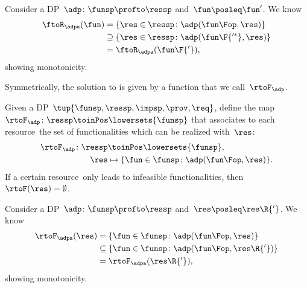 \begin{remark}[Monotonicity]
	Consider a DP~$\adp\colon\funsp\profto\ressp$ and~$\fun\posleq \fun'$.
	We know
	\begin{equation*}
		\begin{aligned}
			\ftoR_\adpa(\fun) & =\{ \res \in \ressp \colon \adp(\fun\Fop, \res)\}             \\
			                  & \supseteq \{ \res \in \ressp \colon \adp(\fun\F{'^*}, \res)\} \\
			                  & =\ftoR_\adpa(\fun\F{'}),
		\end{aligned}
	\end{equation*}
	showing monotonicity.
\end{remark}

Symmetrically, the solution to \FixResMaxFun is given by a function that we call~$\rtoF_\adp$.

\begin{definition}
	\label{def:rtoF-dp}
	Given a DP~$\tup{ \funsp,\ressp,\impsp,\prov,\req}$, define the map~$\rtoF_{\adp}\colon \ressp\toinPos  \lowersets{\funsp}$ that associates to each resource~\res the set of functionalities which can be realized with~$\res$:
	\begin{equation*}
		\begin{aligned}
			\rtoF_{\adp}\colon \ressp & \toinPos \lowersets{\funsp},                              \\
			\res                      & \mapsto \{ \fun \in \funsp \colon \adp(\fun\Fop, \res)\}.
		\end{aligned}
	\end{equation*}
	If a certain resource~\res only leads to infeasible functionalities, then~$\rtoF(\res)=\emptyset$.
\end{definition}

\begin{remark}[Monotonicity]
	Consider a DP~$\adp\colon\funsp\profto\ressp$ and~$\res\posleq \res\R{'}$.
	We know
	\begin{equation*}
		\begin{aligned}
			\rtoF_\adpa(\res) & =\{ \fun \in \funsp \colon \adp(\fun\Fop, \res)\}               \\
			                  & \subseteq \{ \fun \in \funsp \colon \adp(\fun\Fop, \res\R{'})\} \\
			                  & =\rtoF_\adpa(\res\R{'}),
		\end{aligned}
	\end{equation*}
	showing monotonicity.
\end{remark}

